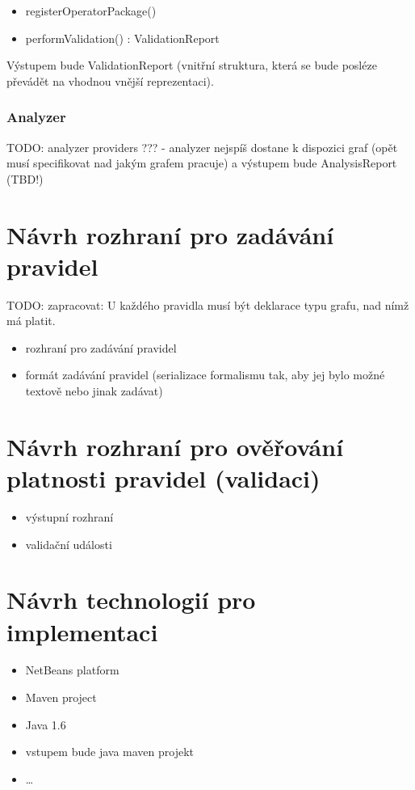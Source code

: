 \begin{itemize}
\item registerOperatorPackage()
\item performValidation() : ValidationReport
\end{itemize}

Výstupem bude ValidationReport (vnitřní struktura, která se bude posléze převádět na vhodnou vnější reprezentaci).

\subsubsection{Analyzer}
TODO: analyzer providers ??? - analyzer nejspíš dostane k dispozici graf (opět musí specifikovat nad jakým grafem pracuje) a výstupem bude AnalysisReport (TBD!)


\section{Návrh rozhraní pro zadávání pravidel}
TODO: zapracovat: U každého pravidla musí být deklarace typu grafu, nad nímž má platit.
\begin{itemize}
\item rozhraní pro zadávání pravidel
\item formát zadávání pravidel (serializace formalismu tak, aby jej bylo možné textově nebo jinak zadávat)
\end{itemize}

\section{Návrh rozhraní pro ověřování platnosti pravidel (validaci)}
\begin{itemize}
\item výstupní rozhraní
\item validační události
\end{itemize}

%
%

\section{Návrh technologií pro implementaci}
\begin{itemize}
\item NetBeans platform
\item Maven project
\item Java 1.6
\item vstupem bude java maven projekt
\item \ldots
\end{itemize}
